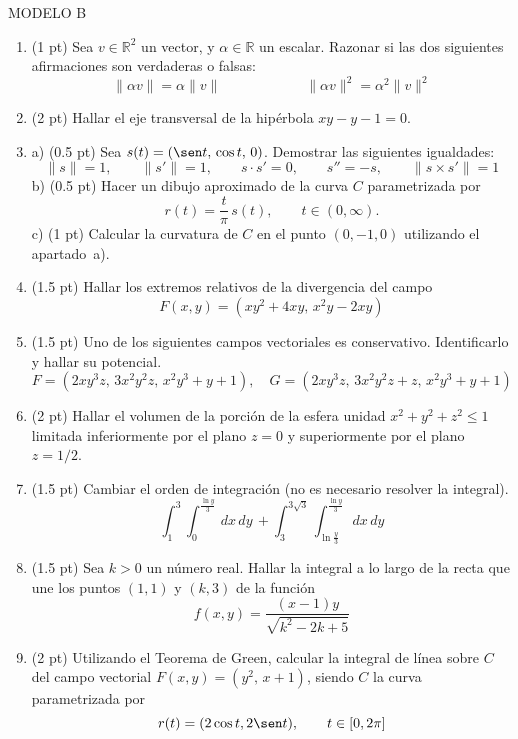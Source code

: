 \documentclass[a4paper, 12pt]{article}
\newcommand{\R}{\mathbb R}
\begin{document}
MODELO B
\vskip 6mm
\begin{enumerate}
\item (1 pt)
Sea $v\in \R^2$ un vector, y $\alpha\in\R$ un escalar. 
Razonar si las dos siguientes afirmaciones son verdaderas o falsas:
$$
\| \alpha v \| = \alpha \| v \| \qquad \qquad \qquad
\| \alpha v\|^2 = \alpha^2 \| v\|^2
$$
\vskip 6mm


\item (2 pt)
Hallar el eje transversal de la hipérbola $xy-y-1=0$.
\vskip 6mm

\item
a) (0.5 pt) Sea $s(t)=(\sen t,\, \cos t,\, 0)$.
Demostrar las siguientes igualdades:
$$
\|s\|=1, \qquad
\|s'\|=1, \qquad
s\cdot s'=0, \qquad
s''=-s, \qquad
\|s\times s'\|=1
$$
b) (0.5 pt) Hacer un dibujo aproximado de la curva $C$ parametrizada por
$$
r(t)=\frac{t}\pi\, s(t),\qquad  t\in(0,\infty).
$$
c) (1 pt)
Calcular la curvatura de $C$ en el punto $(0,-1,0)$ utilizando el apartado~a).

\hrulefill

\item (1.5 pt)
Hallar los extremos relativos de la divergencia del campo
$$
F(x,y)=(xy^2+4xy,\, x^2y-2xy)
$$
\vskip 6mm

\item (1.5 pt)
Uno de los siguientes campos vectoriales es conservativo. Identificarlo y hallar su potencial.
$$
F=(2xy^3z,\, 3x^2y^2z,\, x^2y^3+y+1),
\quad
G=(2xy^3z,\, 3x^2y^2z+z,\, x^2y^3+y+1)
$$
\vskip 6mm

\item (2 pt)
Hallar el volumen de la porción de la esfera unidad
$x^2 + y^2 +z^2 \le 1$
limitada inferiormente por el plano $z = 0$
y superiormente por el plano $z = 1/2$.
\vskip 6mm

\item (1.5 pt)
Cambiar el orden de integración (no es necesario resolver la integral).
$$
\int_1^3 \int_0^\frac{\ln y}3\,dx\,dy\, +
\int_3^{3\sqrt{3}}\int_{\ln \frac{y}3}^\frac{\ln y}3\,dx\,dy
$$
\vskip 6mm

\item (1.5 pt)
Sea $k>0$ un número real.
Hallar la integral a lo largo de la recta que une los puntos $(1,1)$ y $(k,3)$ de la función
$$
f(x,y)=\frac{(x-1)y}{\sqrt{k^2-2k+5}}
$$
\vskip 6mm

\item (2 pt)
Utilizando el Teorema de Green, calcular la integral de línea sobre $C$ del campo vectorial $F(x,y)=(y^2,\, x+1)$, siendo $C$ la curva parametrizada por
$$
r(t)=(2\cos t, 2\sen t),\qquad t\in[0, 2\pi]
$$
\vskip 6mm


\end{enumerate}

\end{document}
